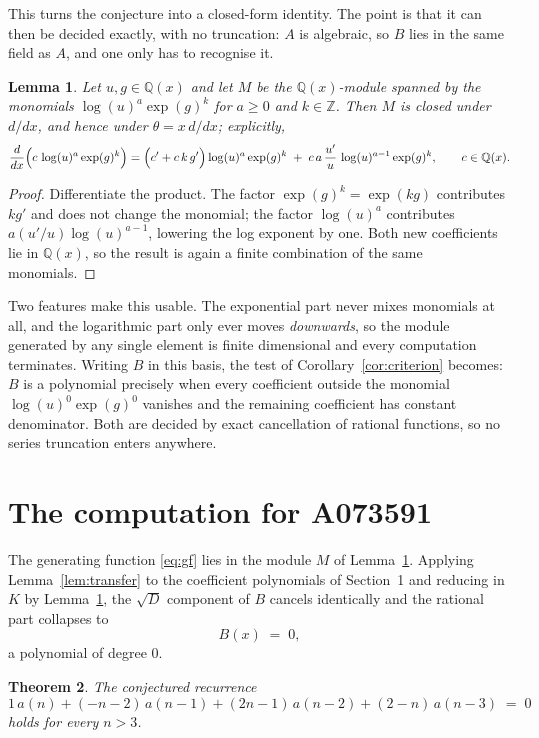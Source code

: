 \documentclass[11pt,a4paper]{article}
\theoremstyle{plain}
\newtheorem{theorem}{Theorem}
\newtheorem{lemma}[theorem]{Lemma}
\theoremstyle{definition}
\begin{document}
This turns the conjecture into a closed-form identity. The point is that it can then be
decided exactly, with no truncation: $A$ is algebraic, so $B$ lies in the same field as
$A$, and one only has to recognise it.

\begin{lemma}\label{lem:field}
Let $u,g\in\mathbb{Q}(x)$ and let $M$ be the $\mathbb{Q}(x)$-module spanned by the
monomials $\log(u)^{a}\exp(g)^{k}$ for $a\ge0$ and $k\in\mathbb{Z}$. Then $M$ is closed
under $d/dx$, and hence under $\theta=x\,d/dx$; explicitly,
\[
\frac{d}{dx}\Bigl(c\,\log(u)^{a}\exp(g)^{k}\Bigr)
=\Bigl(c'+c\,k\,g'\Bigr)\log(u)^{a}\exp(g)^{k}
\;+\;c\,a\,\frac{u'}{u}\,\log(u)^{a-1}\exp(g)^{k},
\qquad c\in\mathbb{Q}(x).
\]
\end{lemma}

\begin{proof}
Differentiate the product. The factor $\exp(g)^{k}=\exp(kg)$ contributes $kg'$ and does
not change the monomial; the factor $\log(u)^{a}$ contributes $a(u'/u)\log(u)^{a-1}$,
lowering the log exponent by one. Both new coefficients lie in $\mathbb{Q}(x)$, so the
result is again a finite combination of the same monomials.
\end{proof}

Two features make this usable. The exponential part never mixes monomials at all, and the
logarithmic part only ever moves \emph{downwards}, so the module generated by any single
element is finite dimensional and every computation terminates. Writing $B$ in this basis,
the test of Corollary~\ref{cor:criterion} becomes: $B$ is a polynomial precisely when every
coefficient outside the monomial $\log(u)^{0}\exp(g)^{0}$ vanishes and the remaining
coefficient has constant denominator. Both are decided by exact cancellation of rational
functions, so no series truncation enters anywhere.

\section{The computation for A073591}

The generating function \eqref{eq:gf} lies in the module $M$ of
Lemma~\ref{lem:field}.
Applying Lemma~\ref{lem:transfer} to the coefficient polynomials of Section~1 and reducing
in $K$ by Lemma~\ref{lem:field}, the $\sqrt{D}$ component of $B$ cancels identically and
the rational part collapses to
\[
B(x)\;=\;0 ,
\]
a polynomial of degree $0$.

\begin{theorem}
The conjectured recurrence
\[
1\,a(n) + (- n - 2)\,a(n-1) + (2 n - 1)\,a(n-2) + (2 - n)\,a(n-3) \;=\;0
\]
holds for every $n>3$.
\end{theorem}
\end{document}
